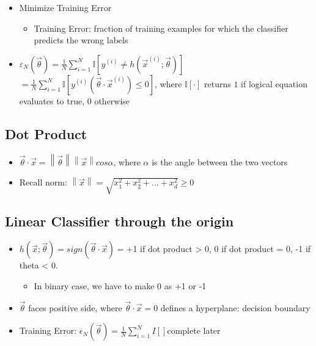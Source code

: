 \documentclass[10pt, oneside]{article}
\newcommand{\norm}[1]{\left\lVert#1\right\rVert}
\begin{document}
\begin{itemize}
\begin{itemize}
        \item Minimize Training Error
        \begin{itemize}
            \item Training Error: fraction of training examples for which the classifier predicts the wrong labels
        \end{itemize}
        \item $\varepsilon_N (\vec{\theta}) = \frac{1}{N} \sum_{i=1} ^N \mathbb{I} [y^{(i)} \neq h(\vec{x} ^{(i)} ; \vec{\theta})]$ \\$= \frac{1}{N} \sum_{i=1} ^N \mathbb{I}[y^{(i)} (\vec{\theta} \cdot \vec{x} ^{(i)}) \leq 0]$, where $\mathbb{I}[\cdot]$ returns $1$ if logical equation evaluates to true, $0$ otherwise
    \end{itemize}
\end{itemize}

\subsection{Dot Product}
\begin{itemize}
    \item $\vec{\theta} \cdot \vec{x} = \norm{\vec{\theta}}\norm{\vec{x}} cos\alpha$, where $\alpha$ is the angle between the two vectors
    \item Recall norm: $\norm{\vec{x}} = \sqrt{x_1^2 + x_2 ^2 + ... + x_d^2} \geq 0$
\end{itemize}

\subsection{Linear Classifier through the origin}
\begin{itemize}
    \item $h(\vec x; \vec \theta) = sign(\vec \theta \cdot \vec x)= $+1 if dot product > 0, 0 if dot product = 0, -1 if theta < 0.
    \begin{itemize}
        \item In binary case, we have to make 0 as +1 or -1
    \end{itemize}
    \item $\vec \theta$ faces positive side, where $\vec \theta \cdot \vec x = 0$ defines a hyperplane: decision boundary
    \item Training Error: $\epsilon_N (\vec \theta) = \frac{1}{N}\sum_{i=1} ^N I[]$complete later
\end{itemize}
\end{document}
